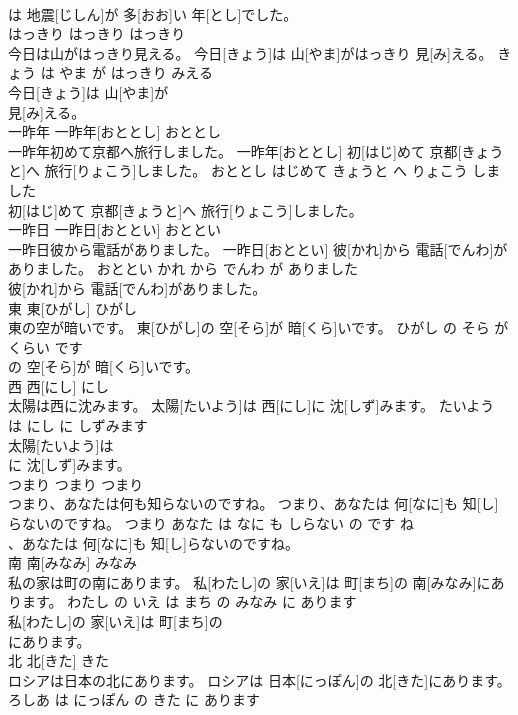\documentclass[8pt]{extreport}
\begin{document}
\begin{CJK}{UTF8}{min}
\\	は 地震[じしん]が 多[おお]い 年[とし]でした。			
\\	はっきり	はっきり	はっきり	
\\	今日は山がはっきり見える。	今日[きょう]は 山[やま]がはっきり 見[み]える。	きょう は やま が はっきり みえる	
\\	今日[きょう]は 山[やま]が
\\	見[み]える。			
\\	一昨年	一昨年[おととし]	おととし	
\\	一昨年初めて京都へ旅行しました。	一昨年[おととし] 初[はじ]めて 京都[きょうと]へ 旅行[りょこう]しました。	おととし はじめて きょうと へ りょこう しました	
\\	初[はじ]めて 京都[きょうと]へ 旅行[りょこう]しました。			
\\	一昨日	一昨日[おととい]	おととい	
\\	一昨日彼から電話がありました。	一昨日[おととい] 彼[かれ]から 電話[でんわ]がありました。	おととい かれ から でんわ が ありました	
\\	彼[かれ]から 電話[でんわ]がありました。			
\\	東	東[ひがし]	ひがし	
\\	東の空が暗いです。	東[ひがし]の 空[そら]が 暗[くら]いです。	ひがし の そら が くらい です	
\\	の 空[そら]が 暗[くら]いです。			
\\	西	西[にし]	にし	
\\	太陽は西に沈みます。	太陽[たいよう]は 西[にし]に 沈[しず]みます。	たいよう は にし に しずみます	
\\	太陽[たいよう]は
\\	に 沈[しず]みます。			
\\	つまり	つまり	つまり	
\\	つまり、あなたは何も知らないのですね。	つまり、あなたは 何[なに]も 知[し]らないのですね。	つまり あなた は なに も しらない の です ね	
\\	、あなたは 何[なに]も 知[し]らないのですね。			
\\	南	南[みなみ]	みなみ	
\\	私の家は町の南にあります。	私[わたし]の 家[いえ]は 町[まち]の 南[みなみ]にあります。	わたし の いえ は まち の みなみ に あります	
\\	私[わたし]の 家[いえ]は 町[まち]の
\\	にあります。			
\\	北	北[きた]	きた	
\\	ロシアは日本の北にあります。	ロシアは 日本[にっぽん]の 北[きた]にあります。	ろしあ は にっぽん の きた に あります	

\end{CJK}
\end{document}
